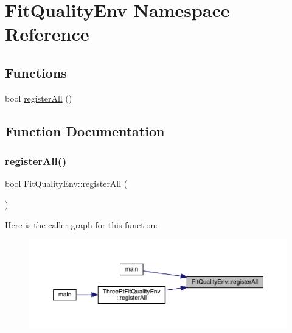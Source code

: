 \hypertarget{namespaceFitQualityEnv}{}\section{Fit\+Quality\+Env Namespace Reference}
\label{namespaceFitQualityEnv}
\subsection*{Functions}
\begin{DoxyCompactItemize}
\item 
bool \mbox{\hyperlink{namespaceFitQualityEnv_ae95637d35e7cfb27b76b593c0d5c822d}{register\+All}} ()
\end{DoxyCompactItemize}


\subsection{Function Documentation}
\mbox{\label{namespaceFitQualityEnv_ae95637d35e7cfb27b76b593c0d5c822d}} 
\subsubsection{\texorpdfstring{registerAll()}{registerAll()}}
{\footnotesize\ttfamily bool Fit\+Quality\+Env\+::register\+All (\begin{DoxyParamCaption}{ }\end{DoxyParamCaption})}

Here is the caller graph for this function\+:
\nopagebreak
\begin{figure}[H]
\begin{center}
\leavevmode
\includegraphics[width=350pt]{de/de1/namespaceFitQualityEnv_ae95637d35e7cfb27b76b593c0d5c822d_icgraph}
\end{center}
\end{figure}
